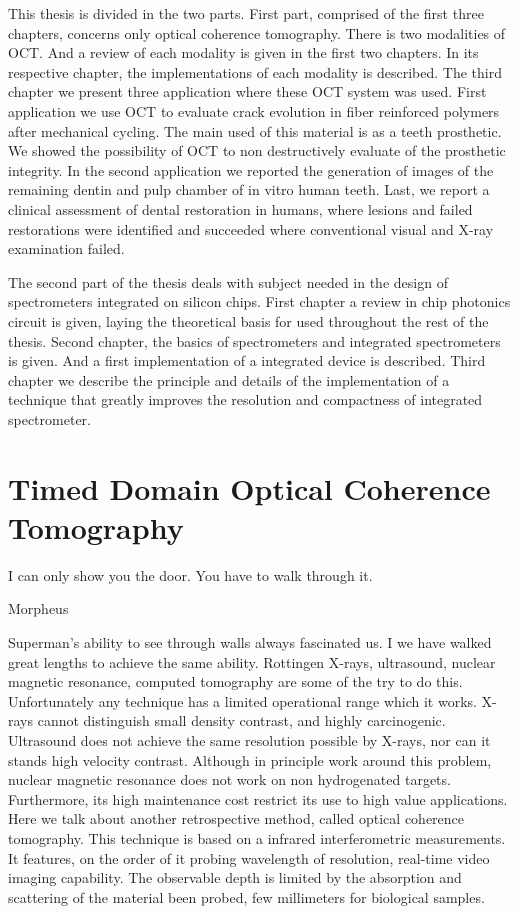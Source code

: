 \documentclass[12pt,twoside,english]{book}
\renewcommand{\~}{\perispomeni}%
\numberwithin{equation}{section}
\numberwithin{figure}{section}
\begin{document}
This thesis is divided in the two parts. First part, comprised of the first three chapters, concerns only optical coherence tomography. There is two modalities of OCT. And a review of each modality is given in the first two chapters. In its respective chapter, the implementations of each modality is described. The third chapter we present three application where these OCT system was used. First application we use OCT to evaluate crack evolution in fiber reinforced polymers after mechanical cycling. The main used of this material is as a teeth prosthetic. We showed the possibility of OCT to non destructively evaluate of the prosthetic integrity. In the second application we reported the generation of images of the remaining dentin and pulp chamber of in vitro human teeth. Last, we report a clinical assessment of dental restoration in humans, where lesions and failed restorations were identified and succeeded where conventional visual and X-ray examination failed. 

The second part of the thesis deals with subject needed in the design of spectrometers integrated on silicon chips. First chapter a review in chip photonics circuit is given, laying the theoretical basis for used throughout the rest of the thesis. Second chapter, the basics of spectrometers and integrated spectrometers is given. And a first implementation of a integrated device is described. Third chapter we describe the principle and details of the implementation of a technique that greatly improves the resolution and compactness of integrated spectrometer.

\chapter[Time Domain OCT]{Timed Domain Optical Coherence Tomography}
\label{chapter:TDOCT}
\epigraph{I can only show you the door. You have to walk through it.}{Morpheus}

Superman's ability to see through walls always fascinated us. I we have walked great lengths to achieve the same ability. Rottingen X-rays, ultrasound, nuclear magnetic resonance, computed tomography are some of the try to do this. Unfortunately any technique has a limited operational range which it works. X-rays cannot distinguish small density contrast, and highly carcinogenic. Ultrasound does not achieve the same resolution possible by X-rays, nor can it stands high velocity contrast. Although in principle work around this problem, nuclear magnetic resonance does not work on non hydrogenated targets. Furthermore, its high maintenance cost restrict its use to high value applications. Here we talk about another retrospective method, called optical coherence tomography. This technique is based on a infrared interferometric measurements. It features, on the order of it probing wavelength of resolution, real-time video imaging capability. The observable depth is limited by the absorption and scattering of the material been probed, few millimeters for biological samples.
\end{document}
